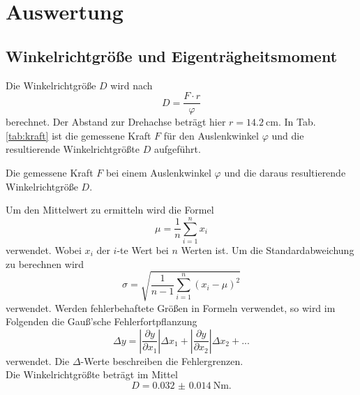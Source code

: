 \section{Auswertung}
\label{sec:Auswertung}
\subsection{Winkelrichtgröße und Eigenträgheitsmoment}
Die Winkelrichtgröße $D$ wird nach
\begin{equation*}
    D = \frac{F \cdot r}{\varphi}
\end{equation*} 
berechnet.
Der Abstand zur Drehachse beträgt hier $r=\SI{14.2}{\centi\metre}$.
In Tab. \ref{tab:kraft} ist die gemessene Kraft $F$ für den Auslenkwinkel $\varphi$ und die resultierende Winkelrichtgrößte $D$ aufgeführt.
\begin{table}
    \centering
    \caption{Die gemessene Kraft $F$ bei einem Auslenkwinkel $\varphi$ und die daraus resultierende Winkelrichtgröße $D$.}
    \label{tab:kraft}  
\end{table}
\FloatBarrier
Um den Mittelwert zu ermitteln wird die Formel
\begin{equation}
    \mu = \frac{1}{n} \sum_{i=1}^n x_i
\end{equation}
verwendet.
Wobei $x_i$ der $i$-te Wert bei $n$ Werten ist.
Um die Standardabweichung zu berechnen wird
\begin{equation}
    \sigma = \sqrt{\frac{1}{n-1} \sum_{i=1}^n (x_i - \mu)^2}
\end{equation}
verwendet.
Werden fehlerbehaftete Größen in Formeln verwendet, so wird im Folgenden die Gauß'sche Fehlerfortpflanzung 
\begin{equation}
    \Delta y = \left|\frac{\partial y}{\partial x_1}\right| \Delta x_1 + \left|\frac{\partial y}{\partial x_2}\right| \Delta x_2 + ...
\end{equation}
verwendet. Die $\Delta$-Werte beschreiben die Fehlergrenzen.
\\
Die Winkelrichtgrößte beträgt im Mittel
\begin{equation*}
    D = \SI{0.032(14)}{\newton\metre} .
\end{equation*}
\\
